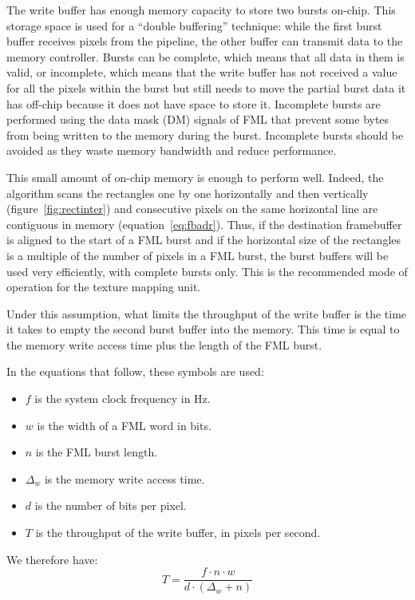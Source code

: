 \documentclass[a4paper,11pt]{kthesis}
\begin{document}
The write buffer has enough memory capacity to store two bursts on-chip. This storage space is used for a ``double buffering'' technique: while the first burst buffer receives pixels from the pipeline, the other buffer can transmit data to the memory controller. Bursts can be complete, which means that all data in them is valid, or incomplete, which means that the write buffer has not received a value for all the pixels within the burst but still needs to move the partial burst data it has off-chip because it does not have space to store it. Incomplete bursts are performed using the data mask (DM) signals of FML that prevent some bytes from being written to the memory during the burst. Incomplete bursts should be avoided as they waste memory bandwidth and reduce performance.

This small amount of on-chip memory is enough to perform well. Indeed, the algorithm scans the rectangles one by one horizontally and then vertically (figure~\ref{fig:rectinter}) and consecutive pixels on the same horizontal line are contiguous in memory (equation~\ref{eq:fbadr}). Thus, if the destination framebuffer is aligned to the start of a FML burst and if the horizontal size of the rectangles is a multiple of the number of pixels in a FML burst, the burst buffers will be used very efficiently, with complete bursts only. This is the recommended mode of operation for the texture mapping unit.

Under this assumption, what limits the throughput of the write buffer is the time it takes to empty the second burst buffer into the memory. This time is equal to the memory write access time plus the length of the FML burst.

In the equations that follow, these symbols are used:
\begin{itemize}
\item $f$ is the system clock frequency in Hz.
\item $w$ is the width of a FML word in bits.
\item $n$ is the FML burst length.
\item $\Delta_{w}$ is the memory write access time.
\item $d$ is the number of bits per pixel.
\item $T$ is the throughput of the write buffer, in pixels per second.
\end{itemize}

We therefore have:
\begin{equation}
T = \frac{f \cdot n \cdot w}{d \cdot (\Delta_{w} + n)}
\end{equation}
\end{document}
